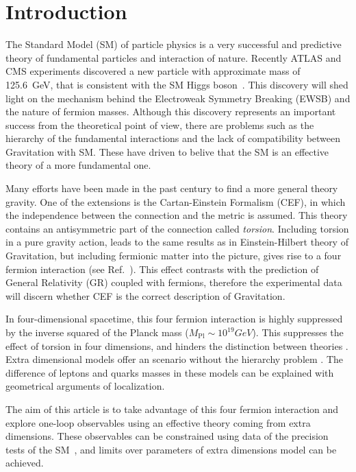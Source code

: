 \section{Introduction}

The Standard Model (SM) of particle physics is a very successful and predictive theory of fundamental particles and interaction of nature. Recently ATLAS and CMS experiments discovered a new particle with approximate mass of \SI{125.6}{\GeV}, that is consistent with the SM Higgs boson~\cite{Aad:2012tfa,Chatrchyan:2012ufa}. This discovery  will shed light on the mechanism behind the Electroweak Symmetry Breaking (EWSB) and the nature of fermion masses. Although this  discovery represents an important success from the theoretical point of view, there are problems such as the hierarchy of the fundamental interactions and the lack of compatibility between Gravitation with SM. These have driven  to belive that the SM is an effective theory of a more fundamental one.

Many efforts have been made in the past century to find a more general theory gravity. One of the extensions is the Cartan-Einstein Formalism (CEF),  in which the independence between the connection and the metric  is assumed. This theory  contains an antisymmetric part of the connection called \textit{torsion}. Including torsion in a pure gravity action, leads to the same results as in Einstein-Hilbert theory of Gravitation, but including fermionic matter into the picture, gives rise to a four fermion interaction  (see Ref.~\cite{Kibble:1961ba}). This effect contrasts with the prediction of General Relativity (GR) coupled with fermions, therefore the experimental data will discern whether CEF is the correct description of Gravitation.

In four-dimensional spacetime, this four fermion interaction is highly suppressed by the inverse squared of the  Planck mass ($M_{\text{Pl}}\sim\si{10^{19}}{GeV}$). This suppresses the effect of torsion in four dimensions, and hinders the distinction between theories . Extra dimensional models offer an scenario without the hierarchy problem \cite{Randall:1999ee,ArkaniHamed:1998rs}. The difference of leptons and quarks masses in these models can be explained with geometrical arguments of localization.

The aim of  this article is to take advantage of this four fermion interaction and explore one-loop observables using an effective theory coming from extra dimensions. These observables can be constrained using data of the precision tests of the SM~\cite{Altarelli:2004fq,Beringer:1900zz}, and limits over parameters of extra dimensions model can be achieved. 

